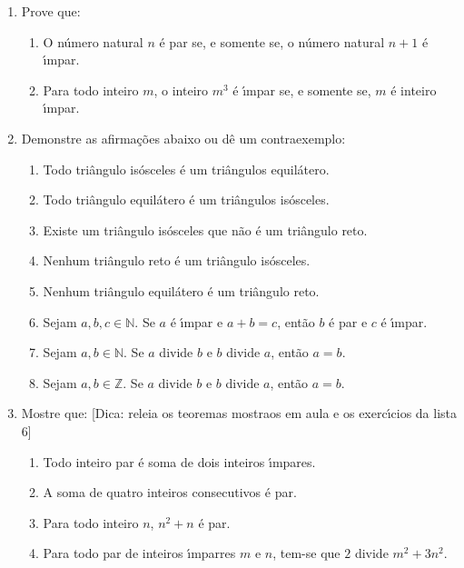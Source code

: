 \documentclass[a4paper,5pt]{amsbook}
\begin{document}
\vspace{1cm}
\begin{enumerate}
    \vspace{0.5cm}
    \item Prove que:
        \begin{enumerate}
            \item O n\'umero natural $n$ \'e par se, e somente se, o n\'umero natural
            $n+1$ \'e \'{\i}mpar.
            \item Para todo inteiro $m$, o inteiro $m^3$ \'e \'{\i}mpar se, e somente
            se, $m$ \'e inteiro \'{\i}mpar.
        \end{enumerate}

    \vspace{0.5cm}
    \item Demonstre as afirma\c{c}\~oes abaixo ou d\^e um contraexemplo:
        \begin{enumerate}
            \item Todo tri\^angulo is\'osceles \'e um tri\^angulos equil\'atero.
            \item Todo tri\^angulo equil\'atero \'e um tri\^angulos is\'osceles.
            \item Existe um tri\^angulo is\'osceles que n\~ao \'e um tri\^angulo reto.
            \item Nenhum tri\^angulo reto \'e um tri\^angulo is\'osceles.
            \item Nenhum tri\^angulo equil\'atero \'e um tri\^angulo reto.
            \item Sejam $a,b,c\in\mathbb{N}$. Se $a$ \'e \'{\i}mpar e $a+b=c$, ent\~ao
            $b$ \'e par e $c$ \'e \'{\i}mpar.
            \item Sejam $a,b\in\mathbb{N}$. Se $a$ divide $b$ e $b$ divide
            $a$, ent\~ao $a=b$.
            \item Sejam $a,b\in\mathbb{Z}$. Se $a$ divide $b$ e $b$ divide
            $a$, ent\~ao $a=b$.
        \end{enumerate}

    \vspace{0.5cm}
    \item Mostre que: [Dica: releia os teoremas mostraos em aula e os
    exerc\'{\i}cios da lista 6]
        \begin{enumerate}
            \item Todo inteiro par \'e soma de dois inteiros \'{\i}mpares.
            \item A soma de quatro inteiros consecutivos \'e par.
            \item Para todo inteiro $n$, $n^2+n$ \'e par.
            \item Para todo par de inteiros \'{\i}mparres $m$ e $n$, tem-se que $2$
            divide $m^2+3n^2$.
        \end{enumerate}
\end{enumerate}
\end{document}
